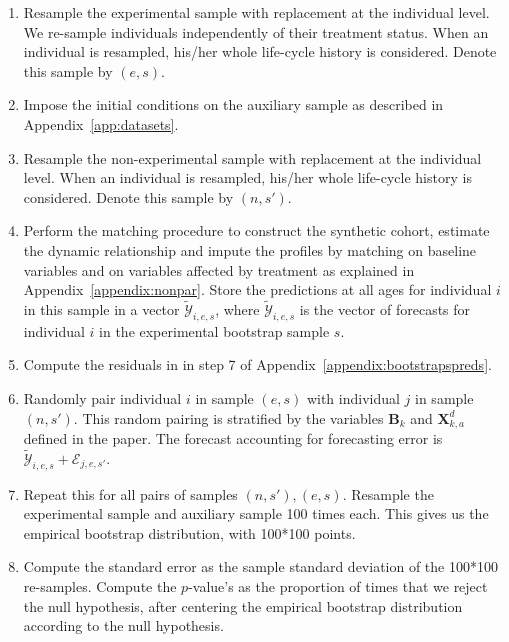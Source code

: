 \begin{enumerate}
\item Resample the experimental sample with replacement at the individual level. We re-sample individuals independently of their treatment status. When an individual is resampled, his/her whole life-cycle history is considered. Denote this sample by $(e,s)$.

\item Impose the initial conditions on the auxiliary sample as described in Appendix~\ref{app:datasets}.

\item Resample the non-experimental sample with replacement at the individual level. When an individual is resampled, his/her whole life-cycle history is considered. Denote this sample by $(n,s')$.

\item Perform the matching procedure to construct the synthetic cohort, estimate the dynamic relationship and impute the profiles by matching on baseline variables and on variables affected by treatment as explained in Appendix~\ref{appendix:nonpar}. Store the predictions at all ages for individual $i$ in this sample in a vector $\mathcal{\tilde{Y}}_{i,e,s}$, where $\mathcal{\tilde{Y}}_{i,e,s}$ is the vector of forecasts for individual $i$ in the experimental bootstrap sample $s$.

\item Compute the residuals in in step 7 of Appendix~\ref{appendix:bootstrapspreds}.

\item Randomly pair individual $i$ in sample $(e,s)$ with individual $j$ in sample $(n,s')$. This random pairing is stratified by the variables $\bm{B}_k$ and $\bm{X}_{k,a}^d$ defined in the paper. The forecast accounting for forecasting error is $\mathcal{\tilde{Y}}_{i,e,s}+ \bm{\mathcal{E}}_{j,e,s'}$.

\item Repeat this for all pairs of samples $(n,s'), (e,s)$. Resample the experimental sample and auxiliary sample 100 times each. This gives us the empirical bootstrap distribution, with 100*100 points.

\item Compute the standard error as the sample standard deviation of the 100*100 re-samples. Compute the $p$-value's as the proportion of times that we reject the null hypothesis, after centering the empirical bootstrap distribution according to the null hypothesis.
\end{enumerate}

